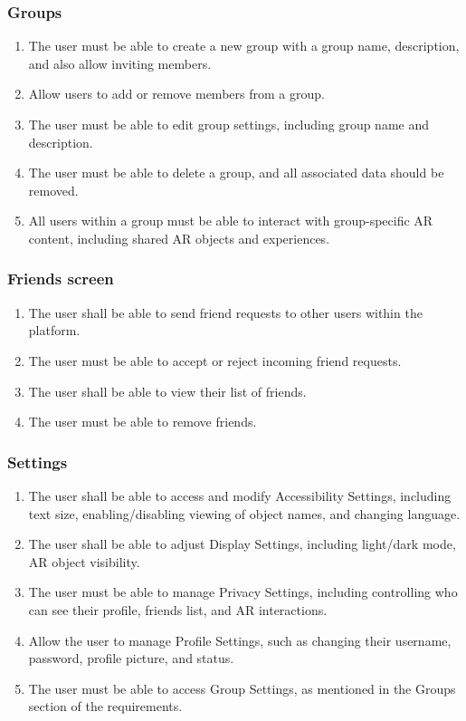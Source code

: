 \documentclass{article}
\begin{document}
\subsubsection{Groups}
\label{ssub:groups}
\begin{enumerate}[align=left, label=\textbf{G-FR\arabic*:}]
    \item The user must be able to create a new group with a group name, description, and also allow inviting members.
    \item Allow users to add or remove members from a group.
    \item The user must be able to edit group settings, including group name and description.
    \item The user must be able to delete a group, and all associated data should be removed.
    \item All users within a group must be able to interact with group-specific AR content, including shared AR objects and experiences.
\end{enumerate}

\subsubsection{Friends screen}
\label{ssub:friends_screen}
\begin{enumerate}[align=left, label=\textbf{FS-FR\arabic*:}]
    \item The user shall be able to send friend requests to other users within the platform.
    \item The user must be able to accept or reject incoming friend requests.
    \item The user shall be able to view their list of friends.
    \item The user must be able to remove friends.
\end{enumerate}

\subsubsection{Settings}
\label{ssub:settings}
\begin{enumerate}[align=left, label=\textbf{S-FR\arabic*:}]
    \item The user shall be able to access and modify Accessibility Settings, including text size, enabling/disabling viewing of object names, and changing language.
    \item The user shall be able to adjust Display Settings, including light/dark mode, AR object visibility.
    \item The user must be able to manage Privacy Settings, including controlling who can see their profile, friends list, and AR interactions.
    \item Allow the user to manage Profile Settings, such as changing their username, password, profile picture, and status.
    \item The user must be able to access Group Settings, as mentioned in the Groups section of the requirements.
\end{enumerate}
\end{document}
